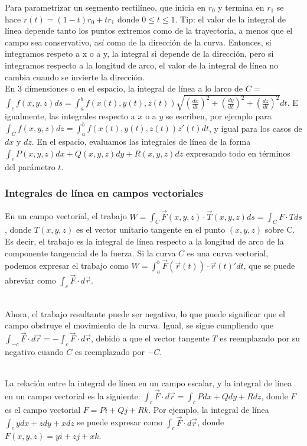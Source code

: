 \documentclass[12pt, letterpaper]{report}
\begin{document}
Para parametrizar un segmento rectilíneo, que inicia en $r_0$ y termina en $r_1$ se hace $r(t) = (1-t)r_0 + tr_1$ donde $0 \leq t \leq 1$. Tip: el valor de 
la integral de línea depende tanto los puntos extremos como de la trayectoria, a menos que el campo sea conservativo, así como 
de la dirección de la curva. Entonces, si integramos respeto a x o a y, la integral si depende 
de la dirección, pero si integramos respecto a la longitud de arco, el valor de la integral de línea no cambia 
cuando se invierte la dirección. \\

En 3 dimensiones o en el espacio, la integral de línea a lo larco de $C$ = $\int_cf(x, y, z)ds = \int_{a}^{b}f(x(t), y(t), z(t))\sqrt{(\frac{dx}{dt})^2 + (\frac{dy}{dt})^2 + (\frac{dz}{dt})^2}dt$. E igualmente, 
las integrales respecto a $x$ o a $y$ se escriben, por ejemplo para $\int_Cf(x, y, z)dz = \int_{a}^{b}f(x(t), y(t), z(t))z'(t)dt$, y igual para los casos de $dx$ y $dz$. En el espacio, 
evaluamos las integrales de línea de la forma $\int_c P(x, y, z)dx + Q(x, y, z)dy + R(x, y, z)dz$ expresando 
todo en términos del parámetro $t$.
\subsubsection*{Integrales de línea en campos vectoriales}
En un campo vectorial, el trabajo $W = \int_C \vec{F}(x, y, z) \cdot \vec{T}(x, y, z)ds = \int_C F\cdot T ds$, donde $T(x, y, z)$ es 
el vector unitario tangente en el punto $(x, y, z)$ sobre C. Es decir, el trabajo es la 
integral de línea respecto a la longitud de arco de la componente tangencial de la fuerza. Si la curva $C$ es una curva vectorial, 
podemos expresar el trabajo como $W = \int_{a}^{b} \vec{F}(\vec{r}(t)) \cdot \vec{r}(t)'dt$, que se puede abreviar como $\int_c \vec{F} \cdot d \vec{r}$. \\ 

Ahora, el trabajo resultante puede ser negativo, lo que puede significar que el campo obstruye el movimiento de la curva. Igual, se sigue cumpliendo que 
$\int_{-c} \vec{F} \cdot d\vec{r} = - \int_c \vec{F} \cdot d\vec{r}$, debido a que el vector tangente $T$ es 
reemplazado por su negativo cuando $C$ es reemplazado por $-C$. \\ 

La relación entre la integral de línea en un campo escalar, y la integral de línea en un campo vectorial es la siguiente: 
$\int_c \vec{F} \cdot d\vec{r} = \int_c Pdx + Qdy + Rdz$, donde $F$ es el campo vectorial $F = Pi + Qj + Rk$. Por ejemplo, 
la integral de línea $\int_c ydx + zdy + xdz$ se puede expresar como $\int_c \vec{F} \cdot d\vec{r}$, donde $F(x, y, z) = yi + zj + xk$. 
\end{document}
